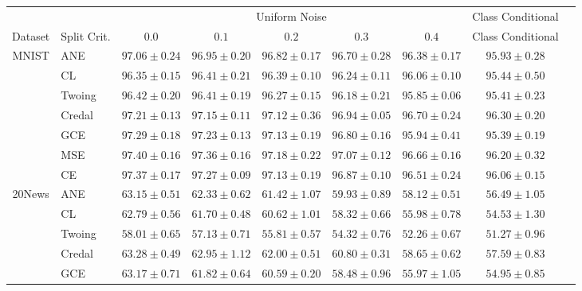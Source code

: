 \documentclass[letterpaper]{article} %
\begin{document}
\begin{table}[t]
	\scriptsize
	\centering
	\begin{tabular}{clccccccc}
&& \multicolumn{5}{c}{Uniform Noise} & Class Conditional \\ \cline{3-8}
Dataset & Split Crit. & $0.0$ & $0.1$ & $0.2$ & $0.3$ & $0.4$ & Class Conditional  \\ \hline
\multirow{7}{*}{MNIST}
 & ANE    & $97.06 \pm 0.24$ & $96.95 \pm 0.20$ & $96.82 \pm 0.17$ & $96.70 \pm 0.28$ & $96.38 \pm 0.17$ & $95.93 \pm 0.28$ \\
 & CL     & $96.35 \pm 0.15$ & $96.41 \pm 0.21$ & $96.39 \pm 0.10$ & $96.24 \pm 0.11$ & $96.06 \pm 0.10$ & $95.44 \pm 0.50$ \\
 & Twoing & $96.42 \pm 0.20$ & $96.41 \pm 0.19$ & $96.27 \pm 0.15$ & $96.18 \pm 0.21$ & $95.85 \pm 0.06$ & $95.41 \pm 0.23$ \\
 & Credal & $\mathbf{97.21 \pm 0.13}$ & $\mathbf{97.15 \pm 0.11}$ & $\mathbf{97.12 \pm 0.36}$ & $96.94 \pm 0.05$ & $\mathbf{96.70 \pm 0.24}$ & $\mathbf{96.30 \pm 0.20}$ \\
 & GCE    & $\mathbf{97.29 \pm 0.18}$ & $\mathbf{97.23 \pm 0.13}$ & $\mathbf{97.13 \pm 0.19}$ & $96.80 \pm 0.16$ & $95.94 \pm 0.41$ & $95.39 \pm 0.19$ \\
 & MSE    & $\mathbf{97.40 \pm 0.16}$ & $\mathbf{97.36 \pm 0.16}$ & $\mathbf{97.18 \pm 0.22}$ & $\mathbf{97.07 \pm 0.12}$ & $\mathbf{96.66 \pm 0.16}$ & $\mathbf{96.20 \pm 0.32}$ \\
 & CE     & $\mathbf{97.37 \pm 0.17}$ & $\mathbf{97.27 \pm 0.09}$ & $\mathbf{97.13 \pm 0.19}$ & $96.87 \pm 0.10$ & $\mathbf{96.51 \pm 0.24}$ & $\mathbf{96.06 \pm 0.15}$ \\
\hline
\multirow{7}{*}{20News}
 & ANE    & $\mathbf{63.15 \pm 0.51}$ & $\mathbf{62.33 \pm 0.62}$ & $\mathbf{61.42 \pm 1.07}$ & $\mathbf{59.93 \pm 0.89}$ & $\mathbf{58.12 \pm 0.51}$ & $\mathbf{56.49 \pm 1.05}$ \\
 & CL     & $\mathbf{62.79 \pm 0.56}$ & $61.70 \pm 0.48$ & $60.62 \pm 1.01$ & $58.32 \pm 0.66$ & $55.98 \pm 0.78$ & $54.53 \pm 1.30$ \\
 & Twoing & $58.01 \pm 0.65$ & $57.13 \pm 0.71$ & $55.81 \pm 0.57$ & $54.32 \pm 0.76$ & $52.26 \pm 0.67$ & $51.27 \pm 0.96$ \\
 & Credal & $\mathbf{63.28 \pm 0.49}$ & $\mathbf{62.95 \pm 1.12}$ & $\mathbf{62.00 \pm 0.51}$ & $\mathbf{60.80 \pm 0.31}$ & $\mathbf{58.65 \pm 0.62}$ & $\mathbf{57.59 \pm 0.83}$ \\
 & GCE    & $\mathbf{63.17 \pm 0.71}$ & $61.82 \pm 0.64$ & $60.59 \pm 0.20$ & $58.48 \pm 0.96$ & $55.97 \pm 1.05$ & $54.95 \pm 0.85$ \\

\end{tabular}
\end{table}
\end{document}
